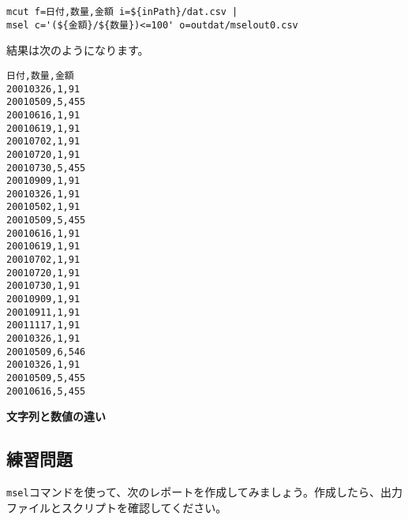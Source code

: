 \begin{verbatim}
mcut f=日付,数量,金額 i=${inPath}/dat.csv |
msel c='(${金額}/${数量})<=100' o=outdat/mselout0.csv
\end{verbatim}

結果は次のようになります。

\begin{verbatim}
日付,数量,金額
20010326,1,91
20010509,5,455
20010616,1,91
20010619,1,91
20010702,1,91
20010720,1,91
20010730,5,455
20010909,1,91
20010326,1,91
20010502,1,91
20010509,5,455
20010616,1,91
20010619,1,91
20010702,1,91
20010720,1,91
20010730,1,91
20010909,1,91
20010911,1,91
20011117,1,91
20010326,1,91
20010509,6,546
20010326,1,91
20010509,5,455
20010616,5,455
\end{verbatim}

{\setlength{\parindent}{0cm}
\textbf{文字列と数値の違い}\\


}

\newpage

\subsection{練習問題}

\verb|msel|コマンドを使って、次のレポートを作成してみましょう。作成したら、出力ファイルとスクリプトを確認してください。

